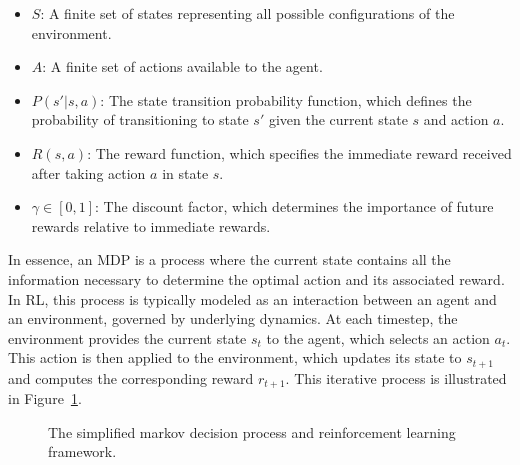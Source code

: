 \documentclass[runningheads]{llncs}
\begin{document}
\begin{itemize}
    \item $S$: A finite set of states representing all possible configurations of the environment.
    \item $A$: A finite set of actions available to the agent.
    \item $P(s'|s, a)$: The state transition probability function, which defines the probability of transitioning to state $s'$ given the current state $s$ and action $a$.
    \item $R(s, a)$: The reward function, which specifies the immediate reward received after taking action $a$ in state $s$.
    \item $\gamma \in [0, 1]$: The discount factor, which determines the importance of future rewards relative to immediate rewards.
\end{itemize}

In essence, an MDP is a process where the current state contains all the information necessary to determine the optimal action and its associated reward. 
In RL, this process is typically modeled as an interaction between an agent and an environment, governed by underlying dynamics. 
At each timestep, the environment provides the current state $s_t$ to the agent, which selects an action $a_t$. 
This action is then applied to the environment, which updates its state to $s_{t+1}$ and computes the corresponding reward $r_{t+1}$. 
This iterative process is illustrated in Figure~\ref{fig:rl_framework}.

\begin{figure}
    \centering
    \caption{The simplified markov decision process and reinforcement learning framework.}
    \label{fig:rl_framework}
\end{figure}
\end{document}
